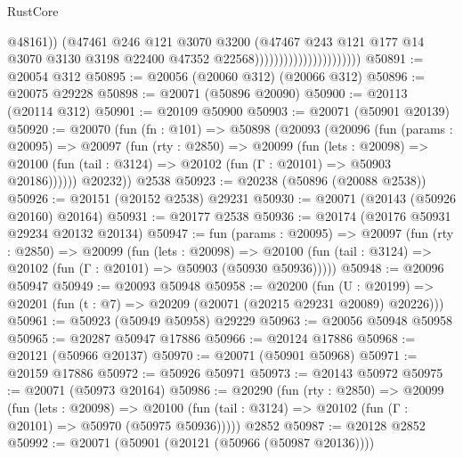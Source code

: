 \begin{lexlean}{RustCore}
\begin{coremodule}
                                                @48161))
                                            (@47461
                                              @246
                                              @121
                                              @3070
                                              @3200
                                              (@47467
                                                @243
                                                @121
                                                @177
                                                @14
                                                @3070
                                                @3130
                                                @3198
                                                @22400
                                                @47352
                                                @22568))))))))))))))))))))))
@50891 := @20054 @312
@50895 := @20056 (@20060 @312) (@20066 @312)
@50896 := @20075 @29228
@50898 := @20071 (@50896 @20090)
@50900 := @20113 (@20114 @312)
@50901 := @20109 @50900
@50903 := @20071 (@50901 @20139)
@50920 := @20070
    (fun (fn : @101) =>
    @50898
      (@20093
        (@20096
          (fun (params : @20095) =>
          @20097
            (fun (rty : @2850) =>
            @20099
              (fun (lets : @20098) =>
              @20100 (fun (tail : @3124) => @20102 (fun (Γ : @20101) => @50903 @20186))))))
        @20232))
    @2538
@50923 := @20238 (@50896 (@20088 @2538))
@50926 := @20151 (@20152 @2538) @29231
@50930 := @20071 (@20143 (@50926 @20160) @20164)
@50931 := @20177 @2538
@50936 := @20174 (@20176 @50931 @29234 @20132 @20134)
@50947 := fun (params : @20095) =>
  @20097
    (fun (rty : @2850) =>
    @20099
      (fun (lets : @20098) =>
      @20100 (fun (tail : @3124) => @20102 (fun (Γ : @20101) => @50903 (@50930 @50936)))))
@50948 := @20096 @50947
@50949 := @20093 @50948
@50958 := @20200
    (fun (U : @20199) => @20201 (fun (t : @7) => @20209 (@20071 (@20215 @29231 @20089) @20226)))
@50961 := @50923 (@50949 @50958) @29229
@50963 := @20056 @50948 @50958
@50965 := @20287 @50947 @17886
@50966 := @20124 @17886
@50968 := @20121 (@50966 @20137)
@50970 := @20071 (@50901 @50968)
@50971 := @20159 @17886
@50972 := @50926 @50971
@50973 := @20143 @50972
@50975 := @20071 (@50973 @20164)
@50986 := @20290
    (fun (rty : @2850) =>
    @20099
      (fun (lets : @20098) =>
      @20100 (fun (tail : @3124) => @20102 (fun (Γ : @20101) => @50970 (@50975 @50936)))))
    @2852
@50987 := @20128 @2852
@50992 := @20071 (@50901 (@20121 (@50966 (@50987 @20136))))

\end{coremodule}
\end{lexlean}
